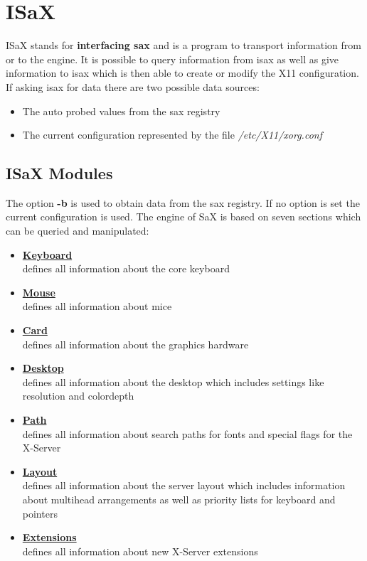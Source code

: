 \chapter{ISaX}
\label{cha:isax}
\minitoc

ISaX stands for \textbf{interfacing sax} and is a program to transport
information from or to the engine. It is possible to query information
from isax as well as give information to isax which is then able to create
or modify the X11 configuration. If asking isax for data there are two
possible data sources:

\begin{itemize}
\item The auto probed values from the sax registry
\item The current configuration represented by the file
      \textit{/etc/X11/xorg.conf}
\end{itemize}

\section{ISaX Modules}
The option \textbf{-b} is used to obtain data from the sax registry.
If no option is set the current configuration is used. The engine of
SaX is based on seven sections which can be queried and manipulated:

\begin{itemize}
\item \textbf{\underline{Keyboard}}\\
      defines all information about the core keyboard
\item \textbf{\underline{Mouse}}\\
      defines all information about mice
\item \textbf{\underline{Card}}\\
      defines all information about the graphics hardware
\item \textbf{\underline{Desktop}}\\
      defines all information about the desktop which includes
      settings like resolution and colordepth
\item \textbf{\underline{Path}}\\
      defines all information about search paths for fonts
      and special flags for the X-Server
\item \textbf{\underline{Layout}}\\
      defines all information about the server layout which
      includes information about multihead arrangements as well
      as priority lists for keyboard and pointers
\item \textbf{\underline{Extensions}}\\
      defines all information about new X-Server extensions
\end{itemize}

